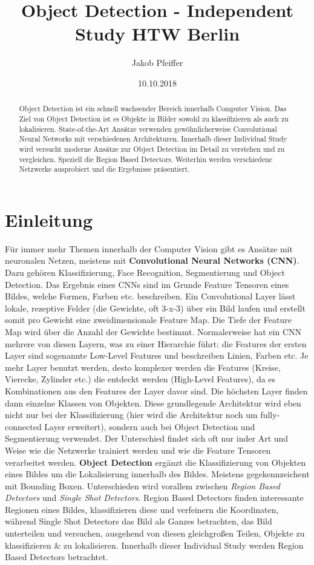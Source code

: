\title{Object Detection - Independent Study HTW Berlin}
\author{Jakob Pfeiffer}
\date{10.10.2018}
\begin{abstract}
Object Detection ist ein schnell wachsender Bereich innerhalb Computer Vision. Das Ziel von Object Detection ist es Objekte in Bilder sowohl zu klassifizieren als auch zu lokalisieren. State-of-the-Art Ansätze verwenden gewöhnlicherweise Convolutional Neural Networks mit verschiedenen Architekturen. Innerhalb dieser Individual Study wird versucht moderne Ansätze zur Object Detection im Detail zu verstehen und zu vergleichen. Speziell die Region Based Detectors. Weiterhin werden verschiedene Netzwerke ausprobiert und die Ergebnisse präsentiert.
\end{abstract}


\tableofcontents 
\newpage
\section{Einleitung}\label{sec:einleitung}
 Für immer mehr Themen innerhalb der Computer Vision gibt es Ansätze mit neuronalen Netzen, meistens mit \textbf{Convolutional Neural Networks (CNN)}. Dazu gehören Klassifizierung, Face Recognition, Segmentierung und Object Detection. Das Ergebnis eines CNNs sind im Grunde Feature Tensoren eines Bildes, welche Formen, Farben etc. beschreiben.  Ein Convolutional Layer lässt lokale, rezeptive Felder (die Gewichte, oft 3-x-3) über ein Bild laufen und erstellt somit pro Gewicht eine zweidimensionale Feature Map. Die Tiefe der Feature Map wird über die Anzahl der Gewichte bestimmt. Normalerweise hat ein CNN mehrere von diesen Layern, was zu einer Hierarchie führt: die Features der ersten Layer sind sogenannte Low-Level Features und beschreiben Linien, Farben etc. Je mehr Layer benutzt werden, desto komplexer werden die Features (Kreise, Vierecke, Zylinder etc.) die entdeckt werden (High-Level Features), da es Kombinationen aus den Features der Layer davor sind. Die höchsten Layer finden dann einzelne Klassen von Objekten.  Diese grundlegende Architektur wird eben nicht nur bei der Klassifizierung (hier wird die Architektur noch um fully-connected Layer erweitert), sondern auch bei Object Detection und Segmentierung verwendet. Der Unterschied findet sich oft nur inder Art und Weise wie die Netzwerke trainiert werden und wie die Feature Tensoren verarbeitet werden.  \textbf{Object Detection} ergänzt die Klassifizierung von Objekten eines Bildes um die Lokalisierung innerhalb des Bildes. Meistens gegekennzeichent mit Bounding Boxen. Unterschieden wird vorallem zwischen \textit{Region Based Detectors} und \textit{Single Shot Detectors}. Region Based Detectors finden interessante Regionen eines Bildes, klassifizieren diese und verfeinern die Koordinaten, während Single Shot Detectors das Bild als Ganzes betrachten, das Bild unterteilen und versuchen, ausgehend von diesen gleichgroßen Teilen, Objekte zu klassifizieren \& zu lokalisieren. Innerhalb dieser Individual Study werden Region Based Detectors betrachtet.
